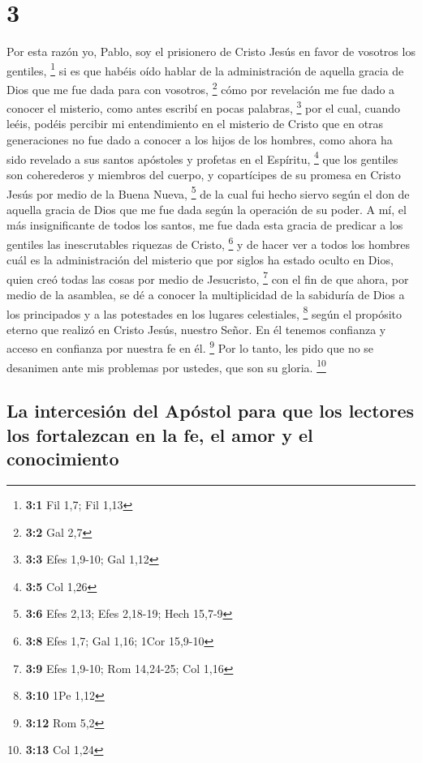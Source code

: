 \hypertarget{section-2}{%
\section{3}\label{section-2}}

 Por esta razón yo, Pablo, soy el prisionero de Cristo
Jesús en favor de vosotros los gentiles, \footnote{\textbf{3:1} Fil 1,7;
  Fil 1,13}  si es que habéis oído hablar de la
administración de aquella gracia de Dios que me fue dada para con
vosotros, \footnote{\textbf{3:2} Gal 2,7}  cómo por
revelación me fue dado a conocer el misterio, como antes escribí en
pocas palabras, \footnote{\textbf{3:3} Efes 1,9-10; Gal 1,12}
 por el cual, cuando leéis, podéis percibir mi
entendimiento en el misterio de Cristo  que en otras
generaciones no fue dado a conocer a los hijos de los hombres, como
ahora ha sido revelado a sus santos apóstoles y profetas en el Espíritu,
\footnote{\textbf{3:5} Col 1,26}  que los gentiles son
coherederos y miembros del cuerpo, y copartícipes de su promesa en
Cristo Jesús por medio de la Buena Nueva, \footnote{\textbf{3:6} Efes
  2,13; Efes 2,18-19; Hech 15,7-9}  de la cual fui hecho
siervo según el don de aquella gracia de Dios que me fue dada según la
operación de su poder.  A mí, el más insignificante de
todos los santos, me fue dada esta gracia de predicar a los gentiles las
inescrutables riquezas de Cristo, \footnote{\textbf{3:8} Efes 1,7; Gal
  1,16; 1Cor 15,9-10}  y de hacer ver a todos los hombres
cuál es la administración del misterio que por siglos ha estado oculto
en Dios, quien creó todas las cosas por medio de Jesucristo, \footnote{\textbf{3:9}
  Efes 1,9-10; Rom 14,24-25; Col 1,16}  con el fin de que
ahora, por medio de la asamblea, se dé a conocer la multiplicidad de la
sabiduría de Dios a los principados y a las potestades en los lugares
celestiales, \footnote{\textbf{3:10} 1Pe 1,12}  según el
propósito eterno que realizó en Cristo Jesús, nuestro Señor.
 En él tenemos confianza y acceso en confianza por
nuestra fe en él. \footnote{\textbf{3:12} Rom 5,2}  Por
lo tanto, les pido que no se desanimen ante mis problemas por ustedes,
que son su gloria. \footnote{\textbf{3:13} Col 1,24}

\hypertarget{la-intercesiuxf3n-del-apuxf3stol-para-que-los-lectores-los-fortalezcan-en-la-fe-el-amor-y-el-conocimiento}{%
\subsection{La intercesión del Apóstol para que los lectores los
fortalezcan en la fe, el amor y el
conocimiento}\label{la-intercesiuxf3n-del-apuxf3stol-para-que-los-lectores-los-fortalezcan-en-la-fe-el-amor-y-el-conocimiento}}

